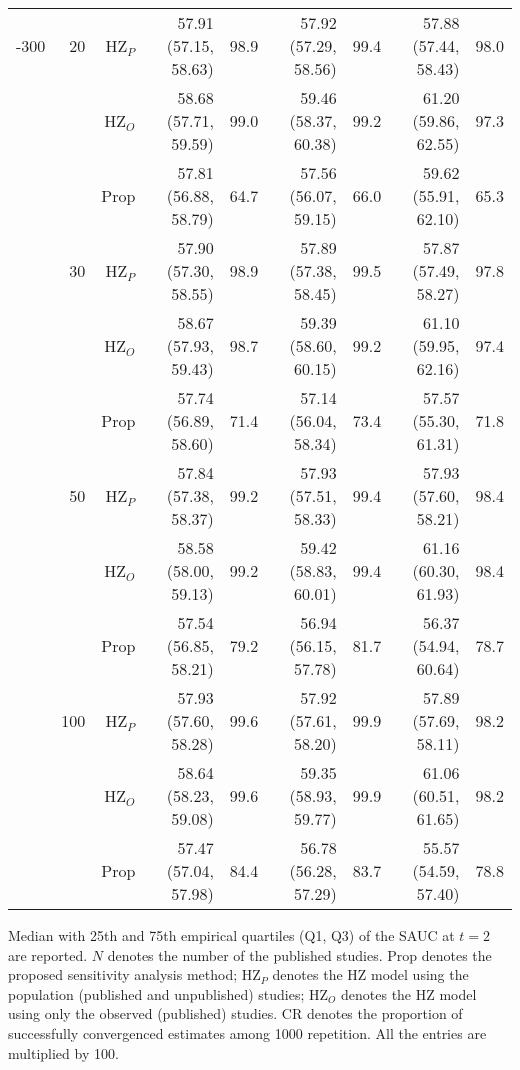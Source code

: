 \begin{table}[!htb]
\begin{threeparttable}
\begin{tabular}[t]{rrrrrrrrr}
\addlinespace
50-300 & 20 & HZ$_P$ & 57.91 (57.15, 58.63) & 98.9 & 57.92 (57.29, 58.56) & 99.4 & 57.88 (57.44, 58.43) & 98.0\\
 &  & HZ$_O$ & 58.68 (57.71, 59.59) & 99.0 & 59.46 (58.37, 60.38) & 99.2 & 61.20 (59.86, 62.55) & 97.3\\
 &  & Prop & 57.81 (56.88, 58.79) & 64.7 & 57.56 (56.07, 59.15) & 66.0 & 59.62 (55.91, 62.10) & 65.3\\
\addlinespace
 & 30 & HZ$_P$ & 57.90 (57.30, 58.55) & 98.9 & 57.89 (57.38, 58.45) & 99.5 & 57.87 (57.49, 58.27) & 97.8\\
 &  & HZ$_O$ & 58.67 (57.93, 59.43) & 98.7 & 59.39 (58.60, 60.15) & 99.2 & 61.10 (59.95, 62.16) & 97.4\\
 &  & Prop & 57.74 (56.89, 58.60) & 71.4 & 57.14 (56.04, 58.34) & 73.4 & 57.57 (55.30, 61.31) & 71.8\\
\addlinespace
 & 50 & HZ$_P$ & 57.84 (57.38, 58.37) & 99.2 & 57.93 (57.51, 58.33) & 99.4 & 57.93 (57.60, 58.21) & 98.4\\
 &  & HZ$_O$ & 58.58 (58.00, 59.13) & 99.2 & 59.42 (58.83, 60.01) & 99.4 & 61.16 (60.30, 61.93) & 98.4\\
 &  & Prop & 57.54 (56.85, 58.21) & 79.2 & 56.94 (56.15, 57.78) & 81.7 & 56.37 (54.94, 60.64) & 78.7\\
\addlinespace
 & 100 & HZ$_P$ & 57.93 (57.60, 58.28) & 99.6 & 57.92 (57.61, 58.20) & 99.9 & 57.89 (57.69, 58.11) & 98.2\\
 &  & HZ$_O$ & 58.64 (58.23, 59.08) & 99.6 & 59.35 (58.93, 59.77) & 99.9 & 61.06 (60.51, 61.65) & 98.2\\
 &  & Prop & 57.47 (57.04, 57.98) & 84.4 & 56.78 (56.28, 57.29) & 83.7 & 55.57 (54.59, 57.40) & 78.8\\
\bottomrule
\end{tabular}
\begin{tablenotes}
\item 
			Median with 25th and 75th empirical quartiles (Q1, Q3) of the SAUC at $t=2$ are reported. 
			$N$ denotes the number of the published studies. 
			Prop denotes the proposed sensitivity analysis method;
			HZ$_P$ denotes the HZ model using the population (published and unpublished) studies; 
			HZ$_O$ denotes the HZ model using only the observed (published) studies.
			CR denotes the proportion of successfully convergenced estimates among 1000 repetition.
			All the entries are multiplied by 100.
\end{tablenotes}
\end{threeparttable}
\end{table}
